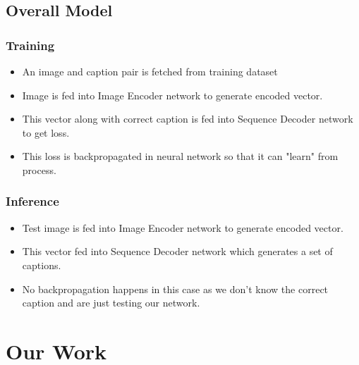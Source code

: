 \documentclass[11pt]{article}
\begin{document}
		\subsection{Overall Model}
			\subsubsection{Training}
				\begin{itemize}
				\item An image and caption pair is fetched from training dataset
				\item Image is fed into Image Encoder network to generate encoded vector.
				\item This vector along with correct caption is fed into Sequence Decoder network to get loss.
				\item This loss is backpropagated in neural network so that it can "learn" from process.
				\end{itemize}
			\subsubsection{Inference}
				\begin{itemize}
				\item Test image is fed into Image Encoder network to generate encoded vector.
				\item This vector fed into Sequence Decoder network which generates a set of captions.
				\item No backpropagation happens in this case as we don't know the correct caption and are just testing our network.
				\end{itemize}	
	\section{Our Work}
	
\end{document}
